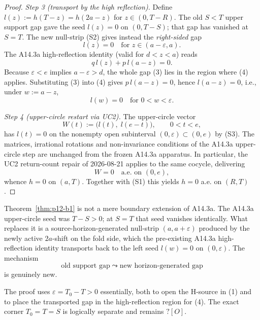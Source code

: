 \begin{proof}
\medskip
\noindent\emph{Step 3 (transport by the high reflection).}
Define $l(z) := h(T - z) = h(2a - z)$ for $z \in (0, T - R)$.  The old
$S < T$ upper support gap gave the seed $l(z) = 0$ on $(0, T - S)$; that
gap has vanished at $S = T$.  The new null-strip (S2) gives instead the
\emph{right-sided} gap
\[
l(z) = 0 \quad \text{for } z \in (a - \varepsilon, a).
\tag{3}
\]
The A14.3a high-reflection identity (valid for $d < z < a$) reads
\[
q\, l(z) + p\, l(a - z) = 0.
\tag{4}
\]
Because $\varepsilon < e$ implies $a - \varepsilon > d$, the whole gap
(3) lies in the region where (4) applies.  Substituting (3) into (4)
gives $p\, l(a - z) = 0$, hence $l(a - z) = 0$, i.e., under
$w := a - z$,
\[
l(w) = 0 \quad \text{for } 0 < w < \varepsilon.
\tag{S3}
\]

\medskip
\noindent\emph{Step 4 (upper-circle restart via UC2).}
The upper-circle vector
\[
W(t) := \bigl(l(t),\; l(e - t)\bigr),\qquad 0 < t < e,
\]
has $l(t) = 0$ on the nonempty open subinterval
$(0, \varepsilon) \subset (0, e)$ by (S3).  The matrices, irrational
rotations and non-invariance conditions of the A14.3a upper-circle
step are unchanged from the frozen A14.3a apparatus.  In particular,
the UC2 return-count repair of 2026-08-21 applies to the same
cocycle, delivering
\[
W = 0 \quad \text{a.e. on } (0, e),
\]
whence $h = 0$ on $(a, T)$.  Together with (S1) this yields $h = 0$
a.e. on $(R, T)$.
\end{proof}

\begin{remark}\label{rem:p12-b1-structural}
Theorem~\ref{thm:p12-b1} is not a mere boundary extension of A14.3a.
The A14.3a upper-circle seed was $T - S > 0$; at $S = T$ that seed
vanishes identically.  What replaces it is a source-horizon-generated
null-strip $(a, a + \varepsilon)$ produced by the newly active
$2a$-shift on the fold side, which the pre-existing A14.3a
high-reflection identity transports back to the left seed
$l(w) = 0$ on $(0, \varepsilon)$.  The mechanism
\[
\text{old support gap}\; \leadsto\; \text{new horizon-generated gap}
\]
is genuinely new.
\end{remark}

\begin{remark}[Scope: the exact corner $T_0 = T$ is not decided]
\label{rem:p12-b1-exact-corner}
The proof uses $\varepsilon = T_0 - T > 0$ essentially, both to open
the H-source in (1) and to place the transported gap in the
high-reflection region for (4).  The exact corner $T_0 = T = S$ is
logically separate and remains \(?[O]\).
\end{remark}
